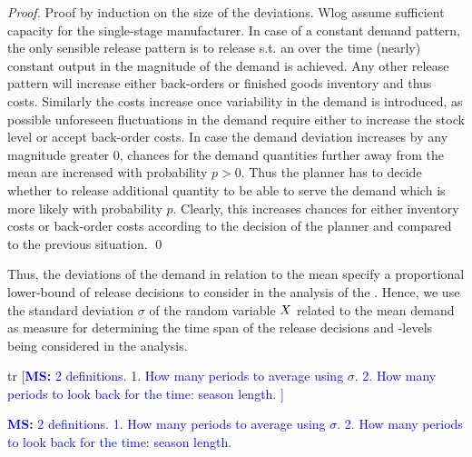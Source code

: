 \documentclass[mnsc]{informs3}
\newcommand\MS[2][r]{\ifx t#1 \textcolor{blue}{[\textbf{MS:} #2]}
  \else \begin{center}\textcolor{blue}{\textbf{MS:} #2} \end{center} \fi}
\begin{document}
\begin{proof}{Proof by induction on the size of the deviations.}
  Wlog assume sufficient capacity for the single-stage manufacturer.
  In case of a constant demand pattern, the only sensible release pattern is to release s.t. an over
  the time (nearly) constant output in the magnitude of the demand is achieved.
  Any other release pattern will increase either back-orders or finished goods inventory and thus
  costs. Similarly the costs increase once variability in the demand is introduced, as possible
  unforeseen fluctuations in the demand require either to increase the stock level or accept
  back-order costs.
  In case the demand deviation increases by any magnitude greater $0$, chances for the demand
  quantities further away from the mean are increased with probability $p>0$. Thus the planner has
  to decide whether to release additional quantity to be able to serve the demand which is more
  likely with probability $p$. Clearly, this increases chances for either inventory costs or
  back-order costs according to the decision of the planner and compared to the previous situation.
  \qed




\end{proof}


Thus, the deviations of the demand in relation to the mean specify a proportional %
lower-bound of release decisions to consider in the analysis of the \LTS{}.
%
Hence, we use the standard deviation $\sigma$ of the random variable $X$ related to the mean demand
as measure for determining the time span of the release decisions and \WIP{}-levels being considered
in the analysis.
%
%
%
%


\MS{2 definitions. 1. How many periods to average using $\sigma$. 2. How many periods to look back
  for the time: season length. }
\end{document}
